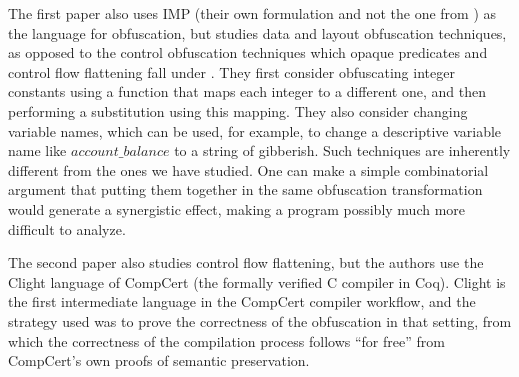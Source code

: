 \documentclass[compsoc,conference,a4paper,10pt,times]{IEEEtran}
\begin{document}
The first paper
\cite{Blazy1} also uses IMP (their own formulation and not the one from \cite{SFV2}) as the language for obfuscation, but studies data and layout obfuscation techniques, as opposed to the control obfuscation techniques which opaque predicates and control flow flattening fall under \cite{CollbergTax}.
%
%
They first consider obfuscating integer constants using a function that maps each integer to a different one, and then performing a substitution using this mapping.  They also consider changing variable names, which can be used, for example, to change a descriptive variable name like $account\_balance$ to a string of gibberish.
Such techniques are inherently different from the ones we have studied. One can make a simple combinatorial argument that putting them together in the same obfuscation transformation would generate a synergistic effect, making a program possibly much more difficult to analyze.

The second paper
\cite{Blazy2} also studies control flow flattening, but the authors use the Clight language of CompCert \cite{CompCert} (the formally verified C compiler in Coq).
Clight is the first intermediate language in the CompCert compiler workflow, and the strategy used was to prove the correctness of the obfuscation in that setting, from which the correctness of the compilation process follows ``for free'' from CompCert's own proofs of semantic preservation.
\end{document}
